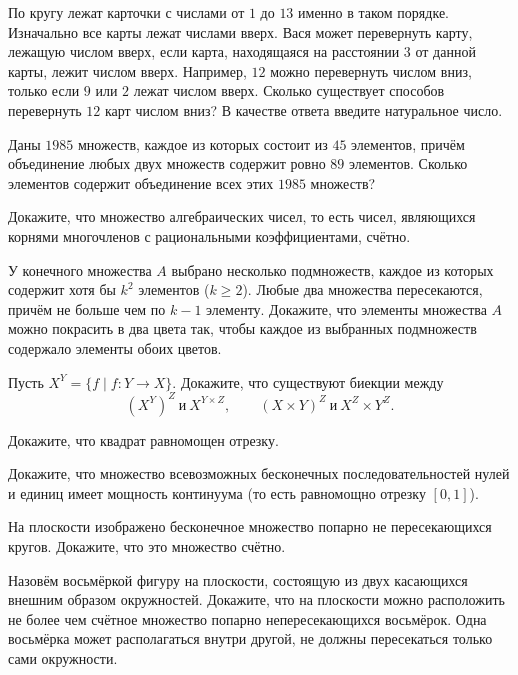 \begin{problems}
\item По кругу лежат карточки с числами от $1$ до $13$ именно в таком порядке. Изначально все карты лежат числами вверх. Вася может перевернуть карту, лежащую числом вверх, если карта, находящаяся на расстоянии $3$ от данной карты, лежит числом вверх. Например, $12$ можно перевернуть числом вниз, только если $9$ или $2$ лежат числом вверх. Сколько существует способов перевернуть $12$ карт числом вниз? В качестве ответа введите натуральное число.

\item Даны $1985$ множеств, каждое из которых состоит из $45$ элементов, причём объединение любых двух множеств содержит ровно $89$ элементов. Сколько элементов содержит объединение всех этих $1985$ множеств?

\item Докажите, что множество алгебраических чисел, то есть чисел, являющихся корнями многочленов с рациональными коэффициентами, счётно.

\item У конечного множества $A$ выбрано несколько подмножеств, каждое из которых содержит хотя бы $k^2$ элементов ($k\ge2$). Любые два множества пересекаются, причём не больше чем по $k-1$ элементу. Докажите, что элементы множества $A$ можно покрасить в два цвета так, чтобы каждое из выбранных подмножеств содержало элементы обоих цветов.

\item Пусть $X^Y=\{f\mid f\colon Y\to X\}$. Докажите, что существуют биекции между
\[
(X^Y)^Z\ \text{и}\ X^{Y\times Z},
\qquad
(X\times Y)^Z\ \text{и}\ X^Z\times Y^Z.
\]

\item Докажите, что квадрат равномощен отрезку.

\item Докажите, что множество всевозможных бесконечных последовательностей нулей и единиц имеет мощность континуума (то есть равномощно отрезку $[0,1]$).

\item
\begin{parts}
  \item На плоскости изображено бесконечное множество попарно не пересекающихся кругов. Докажите, что это множество счётно.
  \item Назовём восьмёркой фигуру на плоскости, состоящую из двух касающихся внешним образом окружностей. Докажите, что на плоскости можно расположить не более чем счётное множество попарно непересекающихся восьмёрок. Одна восьмёрка может располагаться внутри другой, не должны пересекаться только сами окружности.
\end{parts}


\end{problems}
